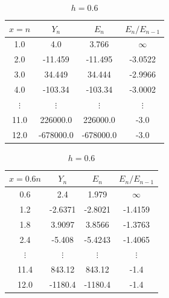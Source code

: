 \documentclass[10pt,a4paper,notitlepage]{article}
\begin{document}
\begin{table}[H]
\parbox{.45\linewidth}{
\centering
\begin{tabular}{|c|c|c|c|} \hline
$x=n$ & $Y_{n}$ & $E_{n}$ & $E_{n}/E_{n-1}$\\ 
\hline 1.0 & 4.0 & 3.766 & $\infty$ \\ 2.0 & -11.459 & -11.495 & -3.0522\\ 3.0 & 34.449 & 34.444 & -2.9966\\ 4.0 & -103.34 & -103.34 & -3.0002 \\ $\vdots$ & $\vdots$ & $\vdots$ & $\vdots$ \\  11.0 & 226000.0 & 226000.0 & -3.0\\ 12.0 & -678000.0 & -678000.0 & -3.0\\ \hline \end{tabular}
\caption{$h=1.0$}
}
\hfill
\parbox{.45\linewidth}{
\centering
\begin{tabular}{ |c|c|c|c| }
\hline
$x=0.6n$ & $Y_{n}$ & $E_{n}$ & $E_{n}/E_{n-1}$\\ 
\hline
0.6 & 2.4 & 1.979 & $\infty$ \\ 1.2 & -2.6371 & -2.8021 & -1.4159\\ 1.8 & 3.9097 & 3.8566 & -1.3763\\ 2.4 & -5.408 & -5.4243 & -1.4065 \\ $\vdots$ & $\vdots$ & $\vdots$ & $\vdots$\\ 11.4 & 843.12 & 843.12 & -1.4\\ 12.0 & -1180.4 & -1180.4 & -1.4\\ \hline \end{tabular}
\caption{$h=0.6$}
}
\end{table}
\end{document}
